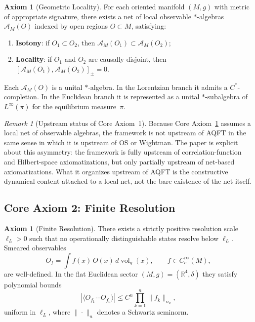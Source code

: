\documentclass[12pt,a4paper]{article}
\theoremstyle{plain}
\theoremstyle{definition}
\newtheorem{axiom}[theorem]{Axiom}
\theoremstyle{remark}
\newtheorem{remark}[theorem]{Remark}
\newcommand{\vol}{\operatorname{vol}}
\newcommand{\real}{\mathbb{R}}
\newcommand{\alg}{\mathcal{A}}
\begin{document}
\begin{axiom}[Geometric Locality]\label{ax:locality}
  For each oriented manifold $(M,g)$ with metric of appropriate
  signature, there exists a net of local observable $*$-algebras
  $\alg_M(O)$ indexed by open regions $O \subset M$, satisfying:
  \begin{enumerate}[nosep,label=(\roman*)]
  \item \textbf{Isotony}: if $O_1 \subset O_2$, then
    $\alg_M(O_1) \subset \alg_M(O_2)$;
  \item \textbf{Locality}: if $O_1$ and $O_2$ are causally disjoint,
    then $[\alg_M(O_1), \alg_M(O_2)]_\pm = 0$.
  \end{enumerate}
  Each $\alg_M(O)$ is a unital $*$-algebra. In the Lorentzian branch
  it admits a $C^*$-completion. In the Euclidean branch it is
  represented as a unital $*$-subalgebra of $L^\infty(\pi)$ for the
  equilibrium measure~$\pi$.
\end{axiom}

\begin{remark}[Upstream status of Core Axiom~1]
  Because Core Axiom~\ref{ax:locality} assumes a local net of
  observable algebras, the framework is not upstream of AQFT in the
  same sense in which it is upstream of OS or Wightman. The paper is
  explicit about this asymmetry: the framework is fully upstream of
  correlation-function and Hilbert-space axiomatizations, but only
  partially upstream of net-based axiomatizations. What it organizes
  upstream of AQFT is the constructive dynamical content attached to a
  local net, not the bare existence of the net itself.
\end{remark}


\subsection{Core Axiom 2: Finite Resolution}

\begin{axiom}[Finite Resolution]\label{ax:resolution}
  There exists a strictly positive resolution scale $\ell_L > 0$ such
  that no operationally distinguishable states resolve below
  $\ell_L$. Smeared observables
  \begin{equation}\label{eq:smear}
    O_f = \int f(x)\, O(x)\, d\vol_g(x),
    \qquad f \in C^\infty_c(M),
  \end{equation}
  are well-defined. In the flat Euclidean sector
  $(M,g) = (\real^4, \delta)$ they satisfy polynomial bounds
  \begin{equation}\label{eq:poly-bounds}
    |\langle O_{f_1} \cdots O_{f_n}\rangle|
    \le C^n \prod_{k=1}^n \|f_k\|_{n_k},
  \end{equation}
  uniform in $\ell_L$, where $\|\cdot\|_n$ denotes a Schwartz
  seminorm.
\end{axiom}
\end{document}
